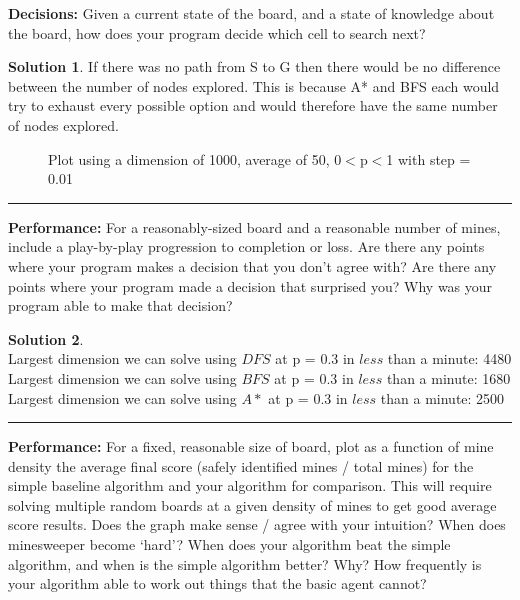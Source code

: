 \documentclass{article}
\theoremstyle{definition}
\def\fline{\rule{0.75\linewidth}{0.5pt}}
\newcommand{\finishline}{\vspace{-15pt}\begin{center}\fline\end{center}}
\newtheorem*{solution*}{Solution}
\newenvironment{solution}{\begin{solution*}}{{\finishline} \end{solution*}}
\begin{document}
\smallskip


\textbf{Decisions:}
	Given a current state of the board, and a state of knowledge about the board, how does your program decide which cell to search next? 
	

\smallskip

\begin{solution}
    If there was no path from S to G then there would be no difference between the number of nodes explored. This is because A* and BFS each would try to exhaust every possible option and would therefore have the same number of nodes explored.
    
	\begin{figure}[h]
	\centering
	\caption{Plot using a dimension of 1000, average of 50, 0$<$p$<$1 with step = 0.01}
	\end{figure}
	
\end{solution}

\smallskip

\textbf{Performance: }
	For a reasonably-sized board and a reasonable number of mines, include a play-by-play progression to completion or loss. Are there any points where your program makes a decision that you don’t agree with?
Are there any points where your program made a decision that surprised you? 
Why was your program able to make that decision? 


\smallskip

\begin{solution} \hfill \\
	Largest dimension we can solve using $DFS$ at p = 0.3 in $less$ than a minute: 4480\\
	Largest dimension we can solve using $BFS$ at p = 0.3 in $less$ than a minute: 1680\\
	Largest dimension we can solve using $A*$ at p = 0.3 in $less$ than a minute: 2500\\
\end{solution}

\smallskip

\textbf{Performance: }
For a fixed, reasonable size of board, plot as a function of mine density the average final score (safely identified mines / total mines) for the simple baseline algorithm and your algorithm for comparison. This will require solving multiple random boards at a given density of mines to get good average score results.
Does the graph make sense / agree with your intuition? When does minesweeper become ‘hard’?
When does your algorithm beat the simple algorithm, and when is the simple algorithm better? Why?
How frequently is your algorithm able to work out things that the basic agent cannot? 
\end{document}
